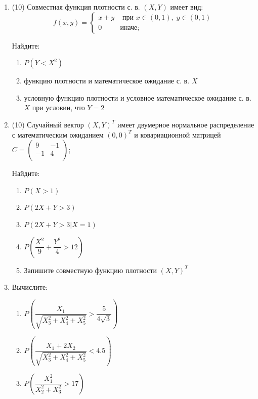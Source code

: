\documentclass[12pt, a4paper]{article}\usepackage[]{graphicx}\usepackage[]{color}
\begin{document}
\begin{enumerate}
\item (10) Совместная функция плотности с. в. $(X,Y)$ имеет вид:
\begin{equation*}
f(x,y) =
 \begin{cases}
   x+y &\text{ при }x \in (0,1),\;y \in (0,1) \\
   0 &\text{иначе};
 \end{cases}
\end{equation*}

Найдите:
\begin{enumerate}
\item $P(Y<X^2)$
\item функцию плотности и математическое ожидание с. в. $X$
\item условную функцию плотности и условное математическое ожидание с. в. $X$ при условии, что $Y=2$
\end{enumerate}

\item (10) Случайный вектор $(X,Y)^T$ имеет двумерное нормальное распределение с математическим ожиданием $(0,0)^T$ и ковариационной матрицей \\
$C = \begin{pmatrix}
9 & -1 \\
-1 & 4 \\
\end{pmatrix}$;

Найдите:
\begin{enumerate}
\item $P(X>1)$
\item $P(2X+Y>3)$
\item $P(2X+Y>3|X=1)$
\item $P\left(\dfrac{X^2}{9}+\dfrac{Y^2}{4} >12\right)$
\item Запишите совместную функцию плотности  $(X,Y)^T$
\end{enumerate}

\item Вычислите:
\begin{enumerate}
\item $P\left(\dfrac{X_1}{\sqrt{X_3^2+X_4^2+X_5^2}}>\dfrac{5}{4\sqrt{3}}\right)$
\item $P\left(\dfrac{X_1+2X_2}{\sqrt{X_3^2+X_4^2+X_5^2}}<4.5\right)$
\item $P\left(\dfrac{X_1^2}{X_2^2+X_3^2}>17\right)$
\end{enumerate}


\end{enumerate}
\end{document}

